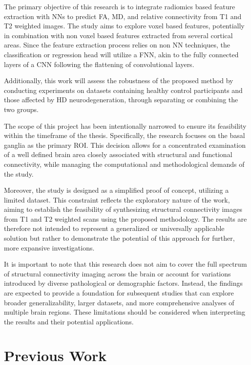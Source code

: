 The primary objective of this research is to integrate radiomics based feature extraction with \ac{NN}s to predict \ac{FA}, \ac{MD}, and relative connectivity from T1 and T2 weighted images. The study aims to explore voxel based features, potentially in combination with non voxel based features extracted from several cortical areas. Since the feature extraction process relies on non \ac{NN} techniques, the classification or regression head will utilize a \ac{FNN}, akin to the fully connected layers of a \ac{CNN} following the flattening of convolutional layers.\par
Additionally, this work will assess the robustness of the proposed method by conducting experiments on datasets containing healthy control participants and those affected by \ac{HD} neurodegeneration, through separating or combining the two groups.\par
The scope of this project has been intentionally narrowed to ensure its feasibility within the timeframe of the thesis. Specifically, the research focuses on the basal ganglia as the primary \ac{ROI}. This decision allows for a concentrated examination of a well defined brain area closely associated with structural and functional connectivity, while managing the computational and methodological demands of the study.\par
Moreover, the study is designed as a simplified proof of concept, utilizing a limited dataset. This constraint reflects the exploratory nature of the work, aiming to establish the feasibility of synthesizing structural connectivity images from T1 and T2 weighted scans using the proposed methodology. The results are therefore not intended to represent a generalized or universally applicable solution but rather to demonstrate the potential of this approach for further, more expansive investigations.\par
It is important to note that this research does not aim to cover the full spectrum of structural connectivity imaging across the brain or account for variations introduced by diverse pathological or demographic factors. Instead, the findings are expected to provide a foundation for subsequent studies that can explore broader generalizability, larger datasets, and more comprehensive analyses of multiple brain regions. These limitations should be considered when interpreting the results and their potential applications.

\section{Previous Work}

